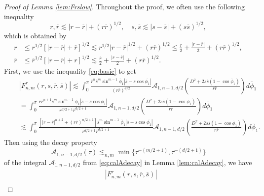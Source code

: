 \documentclass[10pt,a4paper]{amsart}
\newcommand{\br}[1]{\overline{#1}}
\newcommand{\calA}{\mathcal A}
\begin{document}
	\begin{proof}[Proof of Lemma \ref{lem:Frslow}]
		Throughout the proof, we often use the following inequality
		\begin{equation}\label{eq:basic}
			r, \br{r}\lesssim |r-\br{r}|+(r\br{r})^{1/2},\quad s, \br{s}\lesssim |s-\br{s}|+(s\br{s})^{1/2},
		\end{equation}
		which is obtained by
		\begin{equation}
			\begin{aligned}
				r&\leq r^{1/2}[|r-\br{r}|+\br{r}]^{1/2}\lesssim r^{1/2}|r-\br{r}|^{1/2}+(r\br{r})^{1/2}\leq \frac{r}{2}+\frac{|r-\br{r}|}{2}+(r\br{r})^{1/2},\\
				\br{r}&\leq \br{r}^{1/2}[|r-\br{r}|+r]^{1/2}\lesssim \frac{\br{r}}{2}+\frac{|r-\br{r}|}{2}+(r\br{r})^{1/2}.
			\end{aligned}
		\end{equation}
		First, we use the inequality \eqref{eq:basic} to get
		\begin{equation}
			\begin{aligned}
				&|F_{n,m}^{r}(r,s,\br{r},\br{s})|\lesssim \int_{0}^{\pi}\frac{\br{r}^{n}\br{s}^{m}\sin^{m-1}\br{\phi}_{1}|\br{s}-s\cos\br{\phi_{1}}|}{(r\br{r})^{d/2}}%
				\calA_{1,n-1,d/2}\left(\frac{D^{2}+2s\br{s}(1-\cos\br{\phi}_{1})}{r\br{r}}\right)d\br{\phi}_{1}\\
				\quad&=\int_{0}^{\pi}\frac{r\br{r}^{n+1}\br{s}^{m}\sin^{m-1}\br{\phi}_{1}|\br{s}-s\cos\br{\phi_{1}}|}{r^{d/2+1}\br{r}^{d/2+1}}\calA_{1,n-1,d/2}\left(\frac{D^{2}+2s\br{s}(1-\cos\br{\phi}_{1})}{r\br{r}}\right)d\br{\phi}_{1}\\
				\quad&\lesssim %
				\int_{0}^{\pi}\frac{[|r-\br{r}|^{n+2}+(r\br{r})^{n/2+1}]\br{s}^{m}\sin^{m-1}\br{\phi}_{1}|\br{s}-s\cos\br{\phi_{1}}|}{r^{d/2+1}\br{r}^{d/2+1}}\calA_{1,n-1,d/2}\left(\frac{D^{2}+2s\br{s}(1-\cos\br{\phi}_{1})}{r\br{r}}\right)d\br{\phi}_{1}.
			\end{aligned}
		\end{equation}
		Then using the decay property
		\begin{equation}
			\calA_{1,n-1,d/2}(\tau)\lesssim_{n,m} \min\{ \tau^{-(m/2+1)},\tau^{-(d/2+1)}\}
		\end{equation}
		of the integral $ \calA_{1,n-1,d/2} $ from \eqref{eq:calAdecay} in Lemma \ref{lem:calAdecay}, we have
		\begin{equation}
			\begin{aligned}
				&|F_{n,m}^{r}(r,s,\br{r},\br{s})|\\

\end{aligned}
\end{equation}
\end{proof}
\end{document}
